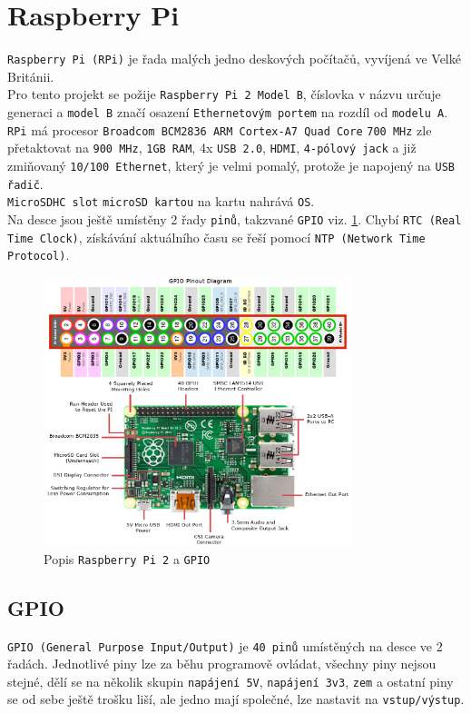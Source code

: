 \documentclass{bakalarka}
\begin{document}
	\section{Raspberry Pi}
		\texttt{Raspberry Pi (RPi)} je řada malých jedno deskových počítačů, vyvíjená ve Velké Británii.\\		
		Pro tento projekt se požije \texttt{Raspberry Pi 2 Model B}, číslovka v názvu určuje generaci a \texttt{model B} značí osazení \texttt{Ethernetovým portem} na rozdíl od \texttt{modelu A}.
		\texttt{RPi} má procesor \texttt{Broadcom BCM2836 ARM Cortex-A7 Quad Core} \texttt{700 MHz} zle přetaktovat na \texttt{900 MHz}, \texttt{1GB RAM}, 4x \texttt{USB 2.0}, \texttt{HDMI}, \texttt{4-pólový jack} a již zmiňovaný \texttt{10/100 Ethernet}, který je velmi pomalý, protože je napojený na \texttt{USB řadič}.\\
		\texttt{MicroSDHC slot} \texttt{microSD kartou} na kartu nahrává \texttt{OS}.\\
		Na desce jsou ještě umístěny 2 řady \texttt{pinů}, takzvané \texttt{GPIO} viz. \ref{fig:rpi2}.
		Chybí \texttt{RTC (Real Time Clock)}, získávání aktuálního času se řeší pomocí \texttt{NTP (Network Time Protocol)}.
	
		\begin{figure}[h]
   		 	\centering
			\includegraphics[width=0.8\textwidth]{../images/rpi2.jpg}	
			\caption{Popis \texttt{Raspberry Pi 2} a \texttt{GPIO}}
    		\label{fig:rpi2}
		\end{figure}
	
	
	
	
		\subsection{GPIO}
			\texttt{GPIO (General Purpose Input/Output)} je \texttt{40 pinů} umístěných na desce ve 2 řadách. Jednotlivé piny lze za běhu programově ovládat, všechny piny nejsou stejné, dělí se na několik skupin \texttt{napájení 5V}, \texttt{napájení 3v3}, \texttt{zem} a ostatní piny se od sebe ještě trošku liší, ale jedno mají společné, lze nastavit na \texttt{vstup/výstup}.
		
\end{document}
